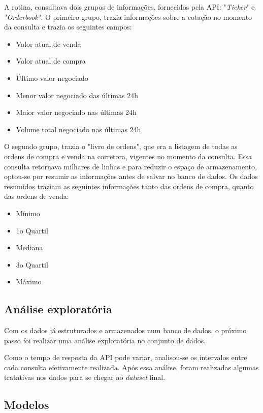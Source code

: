 \documentclass[12pt]{article}
\begin{document}
A rotina, consultava dois grupos de informações, fornecidos pela API: 
"\textit{Ticker}" e \textit{"Orderbook"}. 
O primeiro grupo, trazia informações sobre a cotação no momento da consulta e 
trazia os seguintes campos:

\begin{itemize}
  \item Valor atual de venda
  \item Valor atual de compra
  \item Último valor negociado
  \item Menor valor negociado das últimas 24h
  \item Maior valor negociado nas últimas 24h
  \item Volume total negociado nas últimas 24h
\end{itemize}

O segundo grupo, trazia o "livro de ordens", que era a listagem de todas as 
ordens de compra e venda na corretora, vigentes no momento da consulta. 
Essa consulta retornava milhares de linhas e para reduzir o espaço de 
armazenamento, optou-se por resumir as informações antes de salvar no banco de 
dados. Os dados resumidos traziam as seguintes informações tanto das ordens de 
compra, quanto das ordens de venda:

\begin{itemize}
  \item Mínimo
  \item 1o Quartil
  \item Mediana
  \item 3o Quartil
  \item Máximo
\end{itemize}

\subsection{Análise exploratória}

Com os dados já estruturados e armazenados num banco de dados, o próximo passo
foi realizar uma análise exploratória no conjunto de dados. 

Como o tempo de resposta da API pode variar, analisou-se os intervalos entre 
cada consulta efetivamente realizada. Após essa análise, foram realizadas 
algumas tratativas nos dados para se chegar ao \textit{dataset} final.

\subsection{Modelos}
\end{document}
